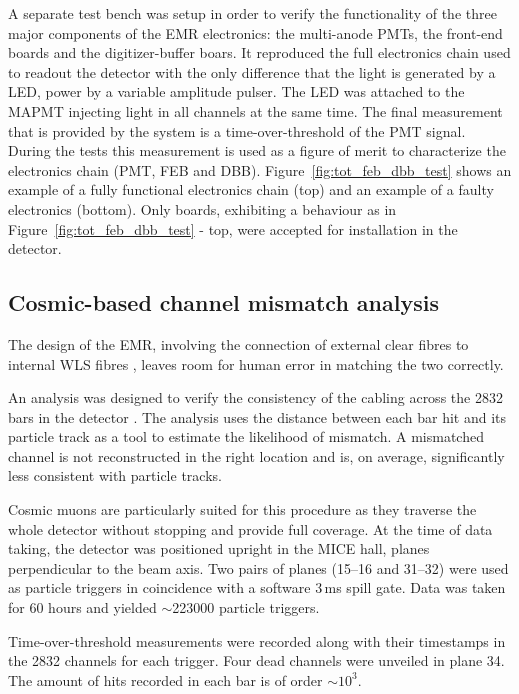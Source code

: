 \documentclass[a4paper,11pt]{article}
\begin{document}
A separate test bench was setup in order to verify the functionality of the three major components of the EMR electronics: the multi-anode PMTs, the 
front-end boards and the digitizer-buffer boars. It reproduced the full electronics chain used to readout the detector with the only difference that the
light is generated by a LED, power by a variable amplitude pulser. The LED was attached to the MAPMT injecting light in all channels at the same time. The
final measurement that is provided by the system is a time-over-threshold of the PMT signal. During the tests this measurement is used as a figure of merit
to characterize the electronics chain (PMT, FEB and DBB). Figure~\ref{fig:tot_feb_dbb_test} shows an example of a fully functional electronics chain (top)
and an example of a faulty electronics (bottom). Only boards, exhibiting a behaviour as in Figure~\ref{fig:tot_feb_dbb_test} - top, were accepted for
installation in the detector.

\subsection{Cosmic-based channel mismatch analysis}\label{sec:cosmics_perform}

The design of the EMR, involving the connection of external clear fibres to internal WLS fibres \cite{emr_design_change}, leaves room for human error in matching the two correctly.

An analysis was designed to verify the consistency of the cabling across the 2832 bars in the detector \cite{Francois}. The analysis uses the distance between each bar hit and its particle track as a tool to estimate the likelihood of mismatch. A mismatched channel is not reconstructed in the right location and is, on average, significantly less consistent with particle tracks.

Cosmic muons are particularly suited for this procedure as they traverse the whole detector without stopping and provide full coverage. At the time of data taking, the detector was positioned upright in the MICE hall, planes perpendicular to the beam axis. Two pairs of planes (15--16 and 31--32) were used as particle triggers in coincidence with a software 3\,ms spill gate. Data was taken for 60 hours and yielded $\sim$223000 particle triggers.

Time-over-threshold measurements were recorded along with their timestamps in the 2832 channels for each trigger. Four dead channels were unveiled in plane 34. The amount of hits recorded in each bar is of order $\sim10^3$.
\end{document}
